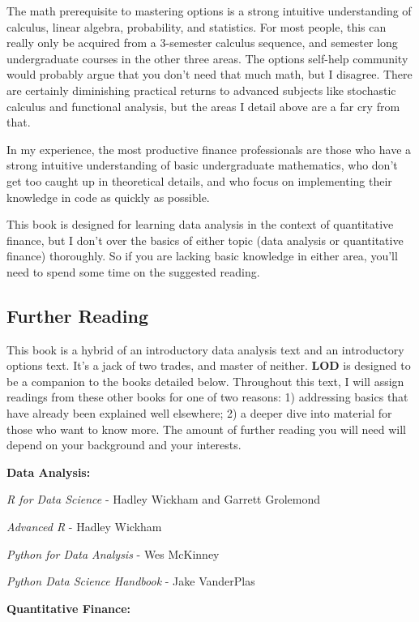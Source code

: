 \documentclass[11pt,]{krantz}
\begin{document}
The math prerequisite to mastering options is a strong intuitive understanding of calculus, linear algebra, probability, and statistics. For most people, this can really only be acquired from a 3-semester calculus sequence, and semester long undergraduate courses in the other three areas. The options self-help community would probably argue that you don't need that much math, but I disagree. There are certainly diminishing practical returns to advanced subjects like stochastic calculus and functional analysis, but the areas I detail above are a far cry from that.

In my experience, the most productive finance professionals are those who have a strong intuitive understanding of basic undergraduate mathematics, who don't get too caught up in theoretical details, and who focus on implementing their knowledge in code as quickly as possible.

This book is designed for learning data analysis in the context of quantitative finance, but I don't over the basics of either topic (data analysis or quantitative finance) thoroughly. So if you are lacking basic knowledge in either area, you'll need to spend some time on the suggested reading.

\subsection{Further Reading}\label{further-reading}

This book is a hybrid of an introductory data analysis text and an introductory options text. It's a jack of two trades, and master of neither. \textbf{LOD} is designed to be a companion to the books detailed below. Throughout this text, I will assign readings from these other books for one of two reasons: 1) addressing basics that have already been explained well elsewhere; 2) a deeper dive into material for those who want to know more. The amount of further reading you will need will depend on your background and your interests.

\textbf{Data Analysis:}

\emph{R for Data Science} - Hadley Wickham and Garrett Grolemond

\emph{Advanced R} - Hadley Wickham

\emph{Python for Data Analysis} - Wes McKinney

\emph{Python Data Science Handbook} - Jake VanderPlas

\textbf{Quantitative Finance:}
\end{document}
